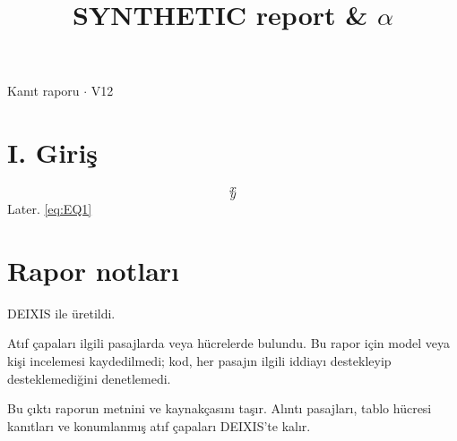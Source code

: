 \documentclass[journal]{IEEEtran}
\begin{document}
\renewcommand{\abstractname}{Özet}
\renewcommand{\IEEEkeywordsname}{Dizin Terimleri}
\renewcommand{\refname}{Kaynaklar}

\title{SYNTHETIC report \& \ensuremath{\alpha}}

\maketitle

\noindent Kanıt raporu \ensuremath{\cdot} V12

\section*{I. Giriş}

\begin{equation}
\label{eq:EQ1}
x
\end{equation}
\cite{Synth26}
\begin{equation}
\label{eq:EQ2}
y
\end{equation}
\cite{Synth26} Later. \eqref{eq:EQ1} \cite{Synth26}

\section*{Rapor notları}

DEIXIS ile üretildi.

Atıf çapaları ilgili pasajlarda veya hücrelerde bulundu. Bu rapor için model veya kişi incelemesi kaydedilmedi; kod, her pasajın ilgili iddiayı destekleyip desteklemediğini denetlemedi.

Bu çıktı raporun metnini ve kaynakçasını taşır. Alıntı pasajları, tablo hücresi kanıtları ve konumlanmış atıf çapaları DEIXIS'te kalır.




\end{document}
